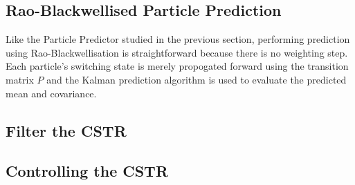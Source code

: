 \documentclass[../masters.tex]{subfiles}
\begin{document}
\subsection{Rao-Blackwellised Particle Prediction}
Like the Particle Predictor studied in the previous section, performing prediction using Rao-Blackwellisation is straightforward because there is no weighting step. Each particle's switching state is merely propogated forward using the transition matrix $P$ and the Kalman prediction algorithm is used to evaluate the predicted mean and covariance.

\subsection{Filter the CSTR}

\subsection{Controlling the CSTR}




\end{document}

